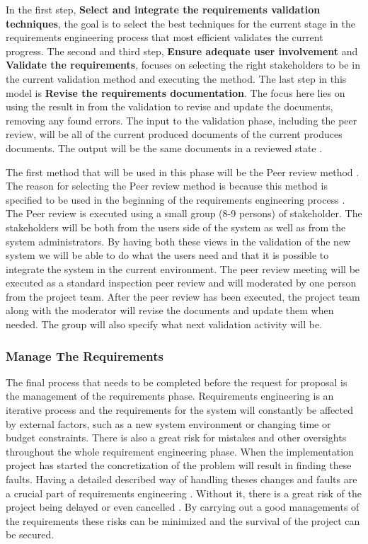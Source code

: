 \documentclass[a4paper]{article}
\begin{document}
In the first step, \textbf{Select and integrate the requirements validation techniques}, the goal is to select the best techniques for the current stage in the requirements engineering process that most efficient validates the current progress. The second and third step, \textbf{Ensure adequate user involvement} and \textbf{Validate the requirements}, focuses on selecting the right stakeholders to be in the current validation method and executing the method. The last step in this model is \textbf{Revise the requirements documentation}. The focus here lies on using the result in from the validation to revise and update the documents, removing any found errors. The input to the validation phase, including the peer review, will be all of the current produced documents of the current produces documents. The output will be the same documents in a reviewed state \cite{gott6}.

The first method that will be used in this phase will be the Peer review method \cite{gott6}. The reason for selecting the Peer review method is because this method is specified to be used in the beginning of the requirements engineering process \cite{gott6}. The Peer review is executed using a small group (8-9 persons) of stakeholder. The stakeholders will be both from the users side of the system as well as from the system administrators. By having both these views in the validation of the new system we will be able to do what the users need and that it is possible to integrate the system in the current environment. The peer review meeting will be executed as a standard inspection peer review and will moderated by one person from the project team. After the peer review has been executed, the project team along with the moderator will revise the documents and update them when needed. The group will also specify what next validation activity will be.

\subsubsection{Manage The Requirements}
\label{subsub:manage_the_requirements}
The final process that needs to be completed before the request for proposal is the management of the requirements phase. Requirements engineering is an iterative process and the requirements for the system will constantly be affected by external factors, such as a new system environment or changing time or budget constraints. There is also a great risk for mistakes and other oversights throughout the whole requirement engineering phase. When the implementation project has started the concretization of the problem will result in finding these faults. Having a detailed described way of handling theses changes and faults are a crucial part of requirements engineering \cite{gott7}. Without it, there is a great risk of the project being delayed or even cancelled \cite{gott7}. By carrying out a good managements of the requirements these risks can be minimized and the survival of the project can be secured. 
\end{document}
